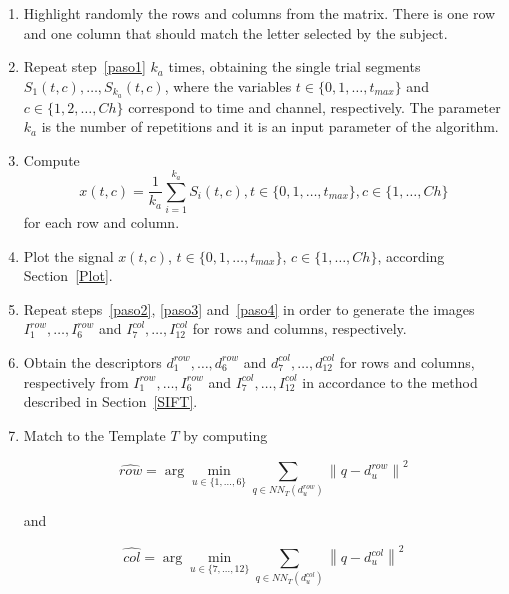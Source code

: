 \documentclass[entropy,article,submit,moreauthors,pdftex,10pt,a4paper]{mdpi}
\begin{document}
\begin{enumerate}
\item \label{paso1}Highlight randomly the rows and columns from the matrix.  There is one row and one column that should match the letter selected by the subject.
\item  \label{paso2} Repeat step~\ref{paso1} $k_a$ times, obtaining the single trial segments $S_1(t,c),\dots,S_{k_a}(t,c)$, where the variables $t \in \{0, 1, \dots, t_{max}\}$ and $c \in \{1,2,\dots,Ch\}$ correspond to time and channel, respectively. The parameter $k_a$ is the number of repetitions and it is an input parameter of the algorithm.
\item \label{paso3} Compute  
\begin{equation}
x(t,c)= \frac{1}{k_a}\sum_{i=1}^{k_a}S_i(t,c), t \in \{0, 1, \dots, t_{max}\}, c \in \{1,\dots,Ch\}
\label{averaging}
\end{equation}  
for each row and column. 

\item \label{paso4}Plot the signal $x(t,c)$,  $t \in \{0, 1, \dots, t_{max}\}$, $c \in \{1,\dots,Ch\}$,  according Section~\ref{Plot}. 

\item Repeat steps~\ref{paso2}, \ref{paso3} and~\ref{paso4} in order to generate the images $I^{row}_1, \dots, I^{row}_6$ and $I^{col}_7,\dots,I^{col}_{12}$ for rows and columns, respectively. 

\item Obtain the descriptors $ d^{row}_1, \dots,  d^{row}_6 $  and  $ d^{col}_7, \dots,  d^{col}_{12} $ for rows and columns, respectively from $I^{row}_1, \dots, I^{row}_6$ and $I^{col}_7,\dots,I^{col}_{12}$  in accordance to the method described in Section~\ref{SIFT}. 

\item Match to the Template $T$ by computing  

\begin{equation}
\hat{row} = \arg \min_{u \in \{1,\dots,6\}} \sum_{q \in NN_T(d^{row}_u)}^{} \left\lVert q -  d^{row}_u \right\rVert ^2
\label{eq:multiclassificationrow}
\end{equation}

\noindent and

\begin{equation}
\hat{col} = \arg \min_{u \in \{7,\dots,12\}} \sum_{q \in NN_T(d^{col}_u)}^{} \left\lVert q -  d^{col}_u \right\rVert ^2
\label{eq:multiclassificationcol}
\end{equation}


\end{enumerate}
\end{document}
